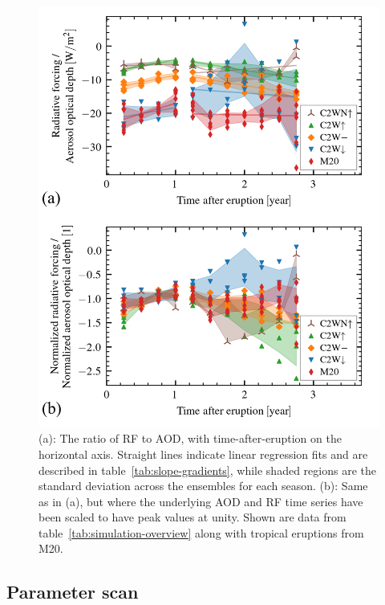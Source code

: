 \documentclass[draft]{agujournal2019}
\begin{document}
\begin{figure}
  \centering
  \includegraphics{figures/figure3.png}

  \caption{(a): The ratio of RF to AOD, with time-after-eruption on the
    horizontal axis. Straight lines indicate linear regression fits and are described in
    table~\ref{tab:slope-gradients}, while shaded regions are the standard deviation across
    the ensembles for each season. (b): Same as in (a), but where the underlying AOD
    and RF time series have been scaled to have peak values at unity. Shown are data
    from table~\ref{tab:simulation-overview} along with tropical eruptions from
    M20.}\label{fig:aod_vs_toa_avg_loop_ratios}%
\end{figure}

\subsection{Parameter scan}
\end{document}
